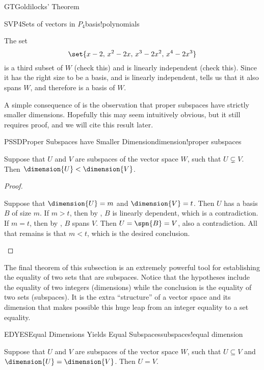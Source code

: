 \begin{subsect}{GT}{Goldilocks' Theorem}
\begin{example}{SVP4}{Sets of vectors in $P_4$}{basis!polynomials}
%
\begin{para}The set
%
\begin{equation*}
\set{x-2,\,x^2-2x,\,x^3-2x^2,\,x^4-2x^3}
\end{equation*}
%
is a third subset of $W$ (check this) and is linearly independent (check this).  Since it has the right size to be a basis, and is linearly independent,  tells us that it also spans $W$, and therefore is a basis of $W$.\end{para}
%
\end{example}
%
\begin{para}A simple consequence of  is the observation that proper subspaces have strictly smaller dimensions.  Hopefully this may seem intuitively obvious, but it still requires proof, and we will cite this result later.\end{para}
%
\begin{theorem}{PSSD}{Proper Subspaces have Smaller Dimension}{dimension!proper subspaces}
\begin{para}
Suppose that $U$ and $V$ are subspaces of the vector space $W$, such that $U\subsetneq V$.  Then $\dimension{U}<\dimension{V}$.
\end{para}
\end{theorem}
%
\begin{proof}
\begin{para}
Suppose that $\dimension{U}=m$ and $\dimension{V}=t$.  Then $U$ has a basis $B$ of size $m$.  If $m>t$, then by , $B$ is linearly dependent, which is a contradiction.  If $m=t$, then by , $B$ spans $V$.  Then $U=\spn{B}=V$, also a contradiction.
All that remains is that $m<t$, which is the desired conclusion.
\end{para}
\end{proof}
%
\begin{para}The final theorem of this subsection is an extremely powerful tool for establishing the equality of two sets that are subspaces.  Notice that the hypotheses include the equality of two integers (dimensions) while the conclusion is the equality of two sets (subspaces).  It is the extra ``structure'' of a vector space and its dimension that makes possible this huge leap from an integer equality to a set equality.\end{para}
%
\begin{theorem}{EDYES}{Equal Dimensions Yields Equal Subspaces}{subspaces!equal dimension}
\begin{para}Suppose that $U$ and $V$ are subspaces of the vector space $W$, such that $U\subseteq V$ and $\dimension{U}=\dimension{V}$.  Then $U=V$.\end{para}

\end{theorem}
\end{subsect}
